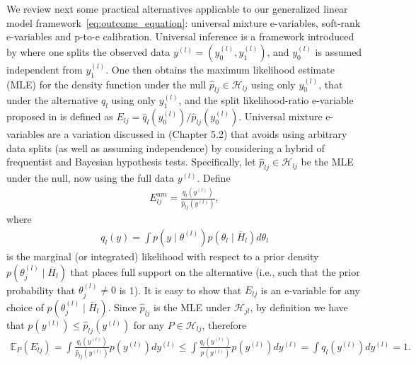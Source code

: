 \documentclass[pdflatex,sn-mathphys-num]{sn-jnl}%
\theoremstyle{thmstyleone}%
\theoremstyle{thmstyletwo}%
\theoremstyle{thmstylethree}%
\begin{document}
We review next some practical alternatives applicable to our generalized linear model framework~\eqref{eq:outcome_equation}:
universal mixture e-variables, soft-rank e-variables and p-to-e calibration.
Universal inference is a framework introduced by \cite{wasserman:2020} %
where one splits the observed data $y^{(l)}=(y_0^{(l)},y_1^{(l)})$, and $y_0^{(l)}$ is assumed independent from $y_1^{(l)}$. One then obtains the maximum likelihood estimate (MLE) for the density function under the null $\hat{p}_{lj} \in \mathcal{H}_{lj}$ using only $y_0^{(l)}$, that under the alternative $\hat{q}_l$ using only $y_1^{(l)}$, and the split likelihood-ratio e-variable proposed in \cite{ramdas:2026} is defined as $E_{lj}= \hat{q}_l(y_0^{(l)}) / \hat{p}_{lj}(y_0^{(l)})$.
Universal mixture e-variables are a variation discussed in \cite{ramdas:2025} (Chapter 5.2) that avoids using arbitrary data splits (as well as assuming independence) by considering a hybrid of frequentist and Bayesian hypothesis tests.
Specifically, let $\hat{p}_{lj} \in \mathcal{H}_{lj}$ be the MLE under the null, now using the full data $y^{(l)}$. Define
\begin{align}
E^{um}_{lj}= \frac{q_l(y^{(l)})}{\hat{p}_{lj}(y^{(l)})},
\label{eq:univ_evalue_mixture}
\end{align}
where
\begin{align}
 q_l(y)= \int p(y \mid \theta^{(l)}) p(\theta_l \mid \overline{H}_l) d\theta_l
\nonumber
\end{align}
is the marginal (or integrated) likelihood with respect to a prior density $p(\theta_j^{(l)} \mid \overline{H}_l)$ that places full support on the alternative %
(i.e., such that the prior probability that $\theta_j^{(l)} \neq 0$ is 1).
It is easy to show that $E_{lj}$ is an e-variable for any choice of $p(\theta_j^{(l)} \mid \overline{H}_l)$.
Since $\hat{p}_{lj}$ is the MLE under $\mathcal{H}_{jl}$, by definition we have that $p(y^{(l)}) \leq \hat{p}_{lj}(y^{(l)})$ for any $P \in \mathcal{H}_{lj}$, therefore
\begin{align}
 \mathbb E_{P} \left( E_{lj} \right)=
\int \frac{q_l(y^{(l)})}{\hat{p}_{lj}(y^{(l)})} p(y^{(l)}) dy^{(l)}
\leq \int \frac{q_l(y^{(l)})}{p(y^{(l)})} p(y^{(l)}) dy^{(l)}= \int q_l(y^{(l)}) dy^{(l)}= 1.
\nonumber
\end{align}
\end{document}
